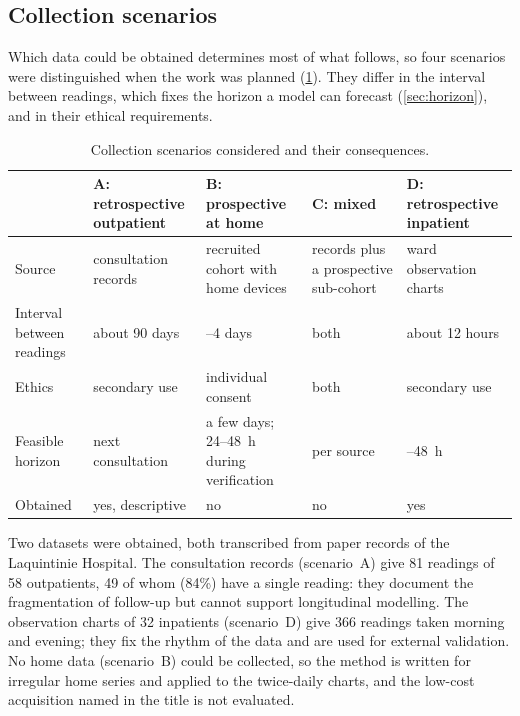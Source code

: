\documentclass[11pt,a4paper,oneside]{report}
\begin{document}
\subsection{Collection scenarios}\label{sec:scenarios}

Which data could be obtained determines most of what follows, so four scenarios were distinguished when the work was planned (\cref{tab:scenarios}). They differ in the interval between readings, which fixes the horizon a model can forecast (\cref{sec:horizon}), and in their ethical requirements.

\begin{table}[htbp]
\centering\footnotesize
\caption{Collection scenarios considered and their consequences.}\label{tab:scenarios}
\begin{tabularx}{\textwidth}{@{}>{\raggedright\arraybackslash}p{2.3cm} >{\raggedright\arraybackslash}X >{\raggedright\arraybackslash}X >{\raggedright\arraybackslash}X >{\raggedright\arraybackslash}X@{}}
\toprule
 & \textbf{A: retrospective outpatient} & \textbf{B: prospective at home} & \textbf{C: mixed} & \textbf{D: retrospective inpatient} \\
\midrule
Source & consultation records & recruited cohort with home devices & records plus a prospective sub-cohort & ward observation charts \\
Interval between readings & about 90 days & 3--4 days & both & about 12 hours \\
Ethics & secondary use & individual consent & both & secondary use \\
Feasible horizon & next consultation & a few days; 24--48~h during verification & per source & 24--48~h \\
Obtained & yes, descriptive & no & no & yes \\
\bottomrule
\end{tabularx}
\end{table}

Two datasets were obtained, both transcribed from paper records of the Laquintinie Hospital. The consultation records (scenario~A) give 81 readings of 58 outpatients, 49 of whom (84\%) have a single reading: they document the fragmentation of follow-up but cannot support longitudinal modelling. The observation charts of 32 inpatients (scenario~D) give 366 readings taken morning and evening; they fix the rhythm of the data and are used for external validation. No home data (scenario~B) could be collected, so the method is written for irregular home series and applied to the twice-daily charts, and the low-cost acquisition named in the title is not evaluated.
\end{document}
